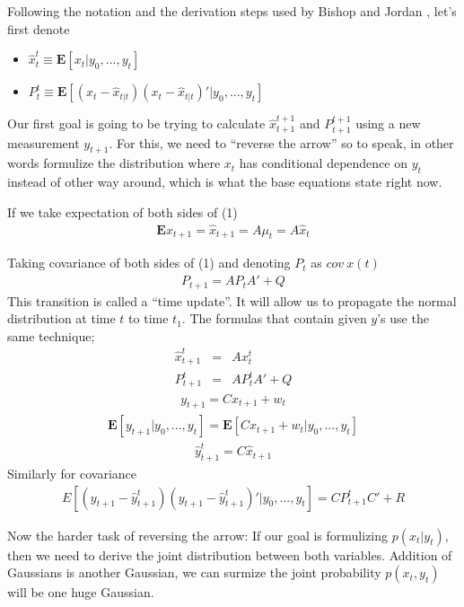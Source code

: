 Following the notation and the derivation steps used by Bishop and Jordan
\cite{jordan}, let's first denote

\begin{itemize}
   \item $\hat{x}_{t}^t \equiv \mathbf{E}[x_t|y_0,...,y_t]$
   \item $P_{t}^t \equiv \mathbf{E}[(x_t - \hat{x}_{t|t})(x_t -
   \hat{x}_{t|t})'|y_0,...,y_t]$ 
\end{itemize}
Our first goal is going to be trying to calculate $\hat{x}_{t+1}^{t+1}$ and
$P_{t+1}^{t+1}$ using a new measurement $y_{t+1}$. For this, we need to
``reverse the arrow'' so to speak, in other words formulize the distribution
where $x_t$ has conditional dependence on $y_t$ instead of other way around,
which is what the base equations state right now.

If we take expectation of both sides of (1)
\begin{eqnarray*}
\mathbf{E}x_{t+1} = \hat{x}_{t+1} = A\mu_t = A\hat{x}_t
\end{eqnarray*}

Taking covariance of both sides of (1) and denoting $P_t$ as $cov \: x(t)$
\begin{eqnarray*}
P_{t+1} = AP_{t}A' + Q
\end{eqnarray*}
This transition is called a ``time update''. It will allow us to propagate the
normal distribution at time $t$ to time $t_1$. The formulas that contain given
$y$'s use the same technique;
\begin{eqnarray*}
\hat{x}_{t+1}^t &=& Ax_{t}^t\\
P_{t+1}^t  &=& AP_{t}^tA' + Q
\end{eqnarray*}
\begin{eqnarray*}
y_{t+1}  = Cx_{t+1} + w_t
\end{eqnarray*}
\begin{eqnarray*}
\mathbf{E}[y_{t+1}|y_0,...,y_t]  = \mathbf{E}[Cx_{t+1}+w_t|y_0,...,y_t]
\end{eqnarray*}
\begin{eqnarray*}
\hat{y}_{t+1}^t  = C\hat{x}_{t+1}
\end{eqnarray*}
Similarly for covariance
\begin{eqnarray*}
E[(y_{t+1}-\hat{y}_{t+1}^t)(y_{t+1}-\hat{y}_{t+1}^t)'|y_0,...,y_t] =
CP_{t+1}^tC' + R
\end{eqnarray*}

Now the harder task of reversing the arrow: If our goal is formulizing
$p(x_t|y_t)$, then we need to derive the joint distribution between both
variables. Addition of Gaussians is another Gaussian, we can surmize the joint
probability $p(x_t,y_t)$ will be one huge Gaussian.

